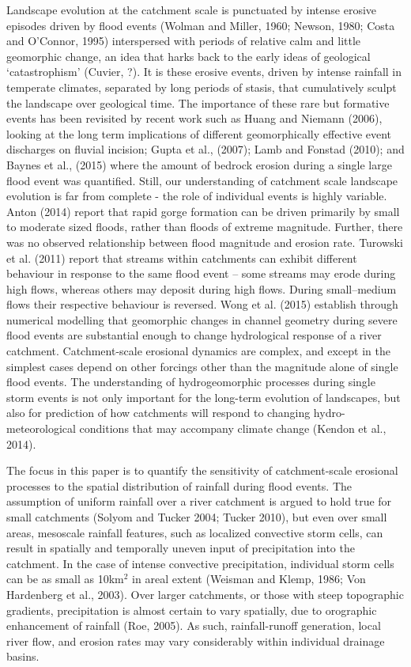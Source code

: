 \documentclass[12pt,oneside,PhD]{muthesis}
\begin{document}
Landscape evolution at the catchment scale is punctuated by intense erosive episodes driven by flood events (Wolman and Miller, 1960; Newson, 1980; Costa and O'Connor, 1995) interspersed with periods of relative calm and little geomorphic change, an idea that harks back to the early ideas of geological `catastrophism' (Cuvier, ?). It is these erosive events, driven by intense rainfall in temperate climates, separated by long periods of stasis, that cumulatively sculpt the landscape over geological time. The importance of these rare but formative events has been revisited by recent work such as Huang and Niemann (2006), looking at the long term implications of different geomorphically effective event discharges on fluvial incision; Gupta et al., (2007); Lamb and Fonstad (2010); and Baynes et al., (2015) where the amount of bedrock erosion during a single large flood event was quantified. Still, our understanding of catchment scale landscape evolution is far from complete - the role of individual events is highly variable. Anton (2014) report that rapid gorge formation can be driven primarily by small to moderate sized floods, rather than floods of extreme magnitude. Further, there was no observed relationship between flood magnitude and erosion rate. Turowski et al. (2011) report that streams within catchments can exhibit different behaviour in response to the same flood event -- some streams may erode during high flows, whereas others may deposit during high flows. During small--medium flows their respective behaviour is reversed. Wong et al. (2015) establish through numerical modelling that geomorphic changes in channel geometry during severe flood events are substantial enough to change hydrological response of a river catchment. Catchment-scale erosional dynamics are complex, and except in the simplest cases depend on other forcings other than the magnitude alone of single flood events.  The understanding of hydrogeomorphic processes during single storm events is not only important for the long-term evolution of landscapes, but also for prediction of how catchments will respond to changing hydro-meteorological conditions that may accompany climate change (Kendon et al., 2014).

The focus in this paper is to quantify the sensitivity of catchment-scale erosional processes to the spatial distribution of rainfall during flood events. The assumption of uniform rainfall over a river catchment is argued to hold true for small catchments (Solyom and Tucker 2004; Tucker 2010), but even over small areas, mesoscale rainfall features, such as localized convective storm cells, can result in spatially and temporally uneven input of precipitation into the catchment. In the case of intense convective precipitation, individual storm cells can be as small as 10km$^2$ in areal extent (Weisman and Klemp, 1986; Von Hardenberg et al., 2003). Over larger catchments, or those with steep topographic gradients, precipitation is almost certain to vary spatially, due to orographic enhancement of rainfall (Roe, 2005). As such, rainfall-runoff generation, local river flow, and erosion rates may vary considerably within individual drainage basins. 
\end{document}

